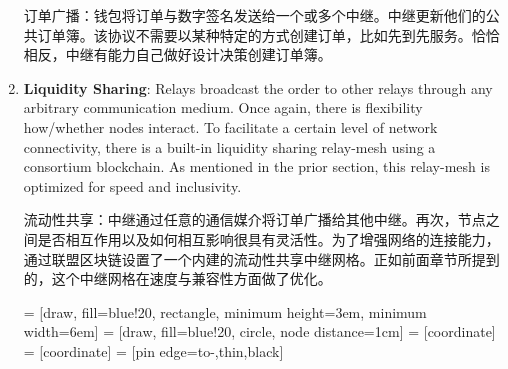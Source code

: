 \documentclass[UTF8,nofonts]{ctexart}
\makeatletter
\newenvironment{figurehere}
 {\def\@captype{figure}}
 {}
\makeatother
\begin{document}
\begin{multicols}{2}
\begin{enumerate}
订单广播：钱包将订单与数字签名发送给一个或多个中继。中继更新他们的公共订单簿。该协议不需要以某种特定的方式创建订单，比如先到先服务。恰恰相反，中继有能力自己做好设计决策创建订单簿。


\item \textbf{Liquidity Sharing}: Relays broadcast the order to other relays through any arbitrary communication medium. Once again, there is flexibility how/whether nodes interact. To facilitate a certain level of network connectivity, there is a built-in liquidity sharing relay-mesh using a consortium blockchain. As mentioned in the prior section, this relay-mesh is optimized for speed and inclusivity.

流动性共享：中继通过任意的通信媒介将订单广播给其他中继。再次，节点之间是否相互作用以及如何相互影响很具有灵活性。为了增强网络的连接能力，通过联盟区块链设置了一个内建的流动性共享中继网格。正如前面章节所提到的，这个中继网格在速度与兼容性方面做了优化。


\begin{center}
\begin{figurehere}
\centering
{} = [draw, fill=blue!20, rectangle, 
    minimum height=3em, minimum width=6em]
 = [draw, fill=blue!20, circle, node distance=1cm]
 = [coordinate]
 = [coordinate]
 = [pin edge={to-,thin,black}]

\end{figurehere}
\end{center}
\end{enumerate}
\end{multicols}
\end{document}
